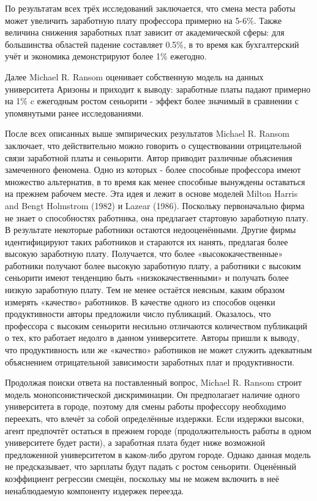 \documentclass[a4paper, 12pt]{article}
\theoremstyle{definition}
\theoremstyle{plain}
\begin{document}
	По результатам всех трёх исследований заключается, что смена места работы может увеличить заработную плату профессора примерно на 5-6\%. Также величина снижения заработных плат зависит от академической сферы: для большинства областей падение составляет 0.5\%, в то время как бухгалтерский учёт и экономика демонстрируют более 1\% ежегодно. 
	
	Далее Michael R. Ransom оценивает собственную модель на данных университета Аризоны и приходит к выводу: заработные платы падают примерно на 1\% c ежегодным ростом сеньорити - эффект более значимый в сравнении с упомянутыми ранее исследованиями. 
	
	После всех описанных выше эмпирических результатов Michael R. Ransom заключает, что действительно можно говорить о существовании отрицательной связи заработной платы и сеньорити. Автор приводит различные объяснения замеченного феномена. Одно из которых - более способные профессора имеют множество альтернатив, в то время как менее способные вынуждены оставаться на прежнем рабочем месте. Эта идея и лежит в основе моделей Milton Harris and Bengt Holmstrom (1982) и Lazear (1986). Поскольку первоначально фирма не знает о способностях работника, она предлагает стартовую заработную плату. В результате некоторые работники остаются недооценёнными. Другие фирмы идентифицируют таких работников и стараются их нанять, предлагая более высокую заработную плату. Получается, что более «высококачественные» работники получают более высокую заработную плату, а работники с высоким сеньорити имеют тенденцию быть «низкокачественными» и получать более низкую заработную плату. Тем не менее остаётся неясным, каким образом измерять «качество» работников. В качестве одного из способов оценки продуктивности авторы предложили число публикаций. Оказалось, что профессора с высоким сеньорити несильно отличаются количеством публикаций о тех, кто работает недолго в данном университете. Авторы пришли к выводу, что продуктивность или же «качество» работников не может служить адекватным объяснением отрицательной зависимости заработных плат и продуктивности.
	
	Продолжая поиски ответа на поставленный вопрос, Michael R. Ransom строит модель монопсонистической дискриминации. Он предполагает наличие одного университета в городе, поэтому для смены работы профессору необходимо переехать, что влечёт за собой определённые издержки. Если издержки высоки, агент предпочтёт остаться в прежнем городе (продолжительность работы в одном университете будет расти), а заработная плата будет ниже возможной предложенной университетом в каком-либо другом городе. Однако данная модель не предсказывает, что зарплаты будут падать с ростом сеньорити. Оценённый коэффициент регрессии смещён, поскольку мы не можем включить в неё ненаблюдаемую компоненту издержек переезда. 
	
\end{document}
